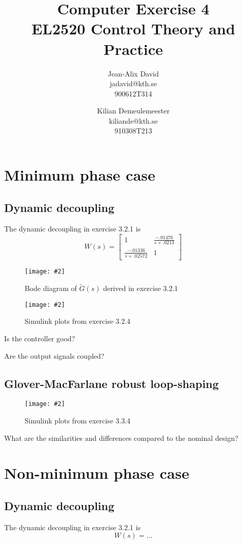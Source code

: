 \documentclass[a4paper,11pt]{article}
\title{
	Computer Exercise 4\\
	EL2520 Control Theory and Practice
}
\author{
	Jean-Alix David\\
	jadavid@kth.se\\
	900612T314
	\and
	Kilian Demeulemeester\\
	kiliande@kth.se\\
	910308T213
}
\newcommand{\image}[3][width=1.0\columnwidth]{
	\begin{figure}[h!]
		\centering
	    \texttt{[image: \#2]}
		\caption{#3}
		\label{fig:#2}
	\end{figure}
}
\begin{document}
	\maketitle

	\section*{Minimum phase case}

	\subsection*{Dynamic decoupling}
	The dynamic decoupling in exercise 3.2.1 is
	\[
        W(s) = \left[\begin{array}{cc} 
            1 & \frac{-.01476}{s + .0213} \\
    \frac{-.01336}{s + .02572} & 1 \end{array} \right]
	\]

	\image{figure_1.pdf}{Bode diagram of $\tilde{G}(s)$ derived in exercise 3.2.1}
	\image{figure_2.pdf}{Simulink plots from exercise 3.2.4}

	Is the controller good?
	\par\dotfill\par\dotfill\par
	Are the output signals coupled?
	\par\dotfill\par\dotfill

	\subsection*{Glover-MacFarlane robust loop-shaping}

	\image{figure_3.pdf}{Simulink plots from exercise 3.3.4}

	What are the similarities and differences compared to the nominal design?
	\par\dotfill\par\dotfill

	\section*{Non-minimum phase case}

	\subsection*{Dynamic decoupling}
	The dynamic decoupling in exercise 3.2.1 is
	\[
		W(s) = \ldots
	\]
\end{document}
